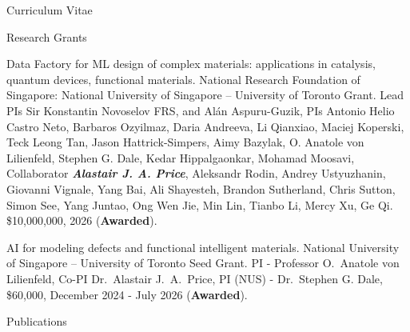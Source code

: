 \documentclass[a4paper,oneside,11pt]{article}
\begin{document}
\begin{cv}{Curriculum Vitae}
\setlength{\cvlabelwidth}{0.5cm}  \begin{cvlist}{Research Grants}
\item[2.] Data Factory for ML design of complex materials: applications in catalysis, quantum devices, functional materials. National Research Foundation of Singapore: National University of Singapore -- University of Toronto Grant. Lead PIs Sir Konstantin Novoselov FRS, and Alán Aspuru-Guzik, PIs Antonio Helio Castro Neto, Barbaros Ozyilmaz, Daria Andreeva, Li Qianxiao, Maciej Koperski, Teck Leong Tan, Jason Hattrick-Simpers, Aimy Bazylak, O. Anatole von Lilienfeld, Stephen G. Dale, Kedar Hippalgaonkar, Mohamad Moosavi, Collaborator {\emph{\bf{Alastair J. A. Price}}}, Aleksandr Rodin, Andrey Ustyuzhanin, Giovanni Vignale, Yang Bai, Ali Shayesteh, Brandon Sutherland, Chris Sutton, Simon See, Yang Juntao, Ong Wen Jie, Min Lin, Tianbo Li, Mercy Xu, Ge Qi. \$10,000,000, 2026 ({\bf Awarded}). 
\item[1.] AI for modeling defects and functional intelligent materials. National University of Singapore -- University of Toronto Seed Grant. PI - Professor O.\ Anatole von Lilienfeld, Co-PI Dr.\ Alastair J.\ A.\ Price, PI (NUS) - Dr.\ Stephen G. Dale, \$60,000, December 2024 - July 2026 ({\bf Awarded}).
\end{cvlist}

  \setlength{\cvlabelwidth}{0.5cm}\begin{cvlist}{Publications}


\end{cvlist}
\end{cv}
\end{document}
